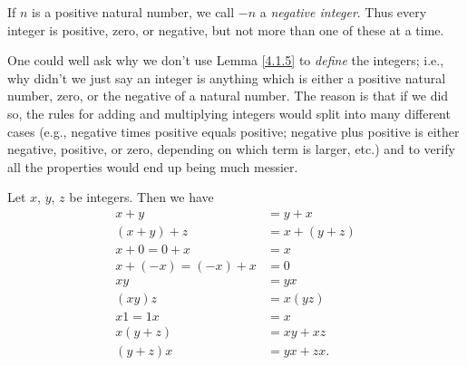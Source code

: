 If \(n\) is a positive natural number, we call \(-n\) a \emph{negative integer}.
Thus every integer is positive, zero, or negative, but not more than one of these at a time.

One could well ask why we don’t use Lemma \ref{4.1.5} to \emph{define} the integers;
i.e., why didn’t we just say an integer is anything which is either a positive natural number, zero, or the negative of a natural number.
The reason is that if we did so, the rules for adding and multiplying integers would split into many different cases (e.g., negative times positive equals positive; negative plus positive is either negative, positive, or zero, depending on which term is larger, etc.) and to verify all the properties would end up being much messier.

\begin{proposition}\label{4.1.6}
Let \(x\), \(y\), \(z\) be integers.
Then we have
\begin{align*}
    x + y &= y + x \\
    (x + y) + z &= x + (y + z) \\
    x + 0 = 0 + x &= x \\
    x + (-x) = (-x) + x &= 0 \\
    xy &= yx \\
    (xy)z &= x(yz) \\
    x1 = 1x &= x \\
    x(y + z) &= xy + xz \\
    (y + z)x &= yx + zx.
\end{align*}
\end{proposition}

